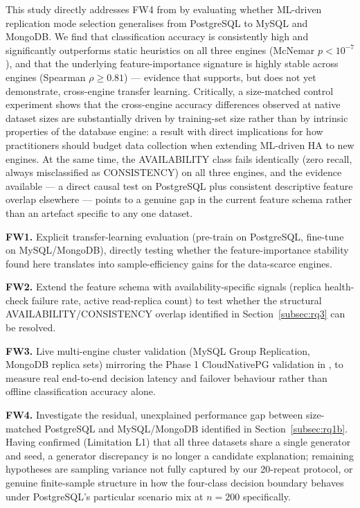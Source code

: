 \documentclass[pdflatex,sn-mathphys-num]{sn-jnl}
\theoremstyle{thmstyleone}
\theoremstyle{thmstylethree}
\begin{document}
This study directly addresses FW4 from \cite{iaha2026} by evaluating
whether ML-driven replication mode selection generalises from
PostgreSQL to MySQL and MongoDB. We find that classification accuracy
is consistently high and significantly outperforms static heuristics
on all three engines (McNemar $p<10^{-7}$), and that the underlying
feature-importance signature is highly stable across engines (Spearman
$\rho \geq 0.81$) --- evidence that supports, but does not yet
demonstrate, cross-engine transfer learning. Critically, a size-matched
control experiment shows that the cross-engine accuracy differences
observed at native dataset sizes are substantially driven by
training-set size rather than by intrinsic properties of the database
engine: a result with direct implications for how practitioners should
budget data collection when extending ML-driven HA to new engines. At
the same time, the AVAILABILITY class fails identically (zero recall,
always misclassified as CONSISTENCY) on all three engines, and the
evidence available --- a direct causal test on PostgreSQL plus
consistent descriptive feature overlap elsewhere --- points to a
genuine gap in the current feature schema rather than an artefact
specific to any one dataset.

\textbf{FW1.} Explicit transfer-learning evaluation (pre-train on
PostgreSQL, fine-tune on MySQL/MongoDB), directly testing whether the
feature-importance stability found here translates into sample-efficiency
gains for the data-scarce engines.

\textbf{FW2.} Extend the feature schema with availability-specific
signals (replica health-check failure rate, active read-replica count)
to test whether the structural AVAILABILITY/CONSISTENCY overlap
identified in Section~\ref{subsec:rq3} can be resolved.

\textbf{FW3.} Live multi-engine cluster validation (MySQL Group
Replication, MongoDB replica sets) mirroring the Phase 1 CloudNativePG
validation in \cite{iaha2026}, to measure real end-to-end decision
latency and failover behaviour rather than offline classification
accuracy alone.

\textbf{FW4.} Investigate the residual, unexplained performance gap
between size-matched PostgreSQL and MySQL/MongoDB identified in
Section~\ref{subsec:rq1b}. Having confirmed (Limitation L1) that all
three datasets share a single generator and seed, a generator
discrepancy is no longer a candidate explanation; remaining
hypotheses are sampling variance not fully captured by our 20-repeat
protocol, or genuine finite-sample structure in how the four-class
decision boundary behaves under PostgreSQL's particular scenario mix
at $n=200$ specifically.
\end{document}
